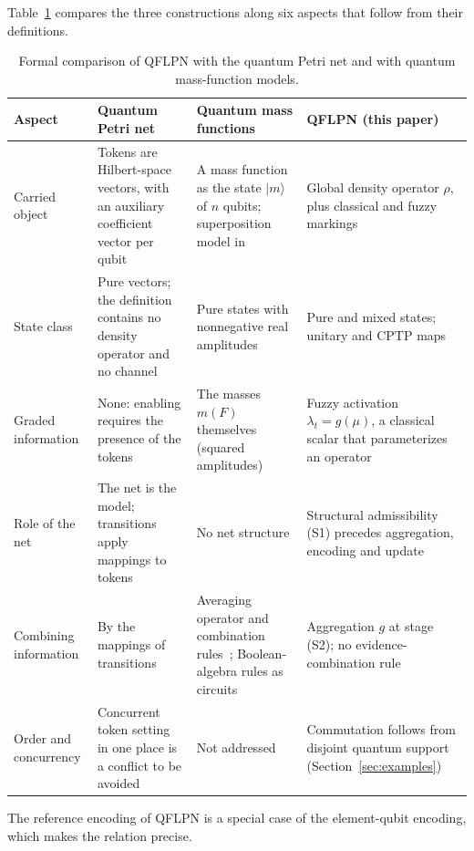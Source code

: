 \documentclass[final,3p,times]{elsarticle}
\begin{document}
Table~\ref{tab:p1-neighbours} compares the three constructions along six aspects that follow from their definitions.
\begin{table}[tbp]
\centering\footnotesize
\caption{Formal comparison of QFLPN with the quantum Petri net and with quantum mass-function models.}
\label{tab:p1-neighbours}
\begin{tabular}{p{2.3cm}p{3.6cm}p{3.6cm}p{3.6cm}}
\toprule
Aspect & Quantum Petri net~\cite{ref4,ref5} & Quantum mass functions~\cite{refDeng2023,refZhouBFQC,refZhouTBM} & QFLPN (this paper) \\
\midrule
Carried object & Tokens are Hilbert-space vectors, with an auxiliary coefficient vector per qubit & A mass function as the state $|m\rangle$ of $n$ qubits; superposition model in~\cite{refDeng2023} & Global density operator $\rho$, plus classical and fuzzy markings \\
State class & Pure vectors; the definition contains no density operator and no channel & Pure states with nonnegative real amplitudes & Pure and mixed states; unitary and CPTP maps \\
Graded information & None: enabling requires the presence of the tokens & The masses $m(F)$ themselves (squared amplitudes) & Fuzzy activation $\lambda_t=g(\mu)$, a classical scalar that parameterizes an operator \\
Role of the net & The net is the model; transitions apply mappings to tokens & No net structure & Structural admissibility (S1) precedes aggregation, encoding and update \\
Combining information & By the mappings of transitions & Averaging operator and combination rules~\cite{refDeng2023}; Boolean-algebra rules as circuits~\cite{refZhouTBM} & Aggregation $g$ at stage (S2); no evidence-combination rule \\
Order and concurrency & Concurrent token setting in one place is a conflict to be avoided & Not addressed & Commutation follows from disjoint quantum support (Section~\ref{sec:examples}) \\
\bottomrule
\end{tabular}
\end{table}

The reference encoding of QFLPN is a special case of the element-qubit encoding, which makes the relation precise.
\end{document}
